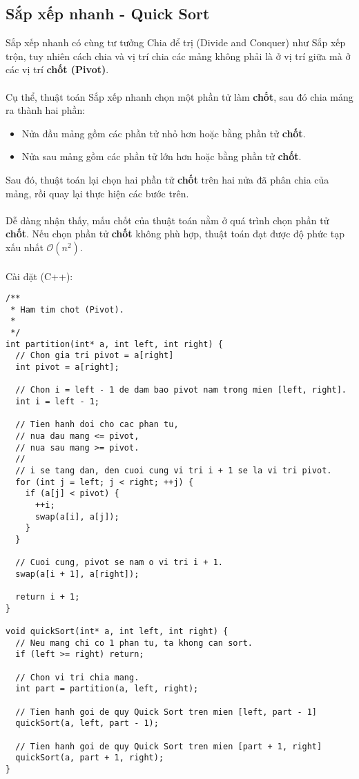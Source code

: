 \documentclass[]{article}
\begin{document}
\subsection{Sắp xếp nhanh - Quick Sort}
Sắp xếp nhanh có cùng tư tưởng Chia để trị (Divide and Conquer) như Sắp xếp trộn, tuy nhiên cách chia và vị trí chia các mảng không phải là ở vị trí giữa mà ở các vị trí \textbf{chốt (Pivot)}.
\\\\
Cụ thể, thuật toán Sắp xếp nhanh chọn một phần tử làm \textbf{chốt}, sau đó chia mảng ra thành hai phần:
\begin{itemize}
\item Nửa đầu mảng gồm các phần tử nhỏ hơn hoặc bằng phần tử \textbf{chốt}.
\item Nửa sau mảng gồm các phần tử lớn hơn hoặc bằng phần tử \textbf{chốt}.
\end{itemize}
Sau đó, thuật toán lại chọn hai phần tử \textbf{chốt} trên hai nửa đã phân chia của mảng, rồi quay lại thực hiện các bước trên.
\\\\
Dễ dàng nhận thấy, mấu chốt của thuật toán nằm ở quá trình chọn phần tử \textbf{chốt}. Nếu chọn phần tử \textbf{chốt} không phù hợp, thuật toán đạt được độ phức tạp xấu nhất $\mathcal{O}(n^2)$.
\\\\
Cài đặt (C++):
\begin{lstlisting}
/**
 * Ham tim chot (Pivot).
 *
 */
int partition(int* a, int left, int right) {
  // Chon gia tri pivot = a[right]
  int pivot = a[right];

  // Chon i = left - 1 de dam bao pivot nam trong mien [left, right].
  int i = left - 1;

  // Tien hanh doi cho cac phan tu,
  // nua dau mang <= pivot,
  // nua sau mang >= pivot.
  //
  // i se tang dan, den cuoi cung vi tri i + 1 se la vi tri pivot.
  for (int j = left; j < right; ++j) {
    if (a[j] < pivot) {
      ++i;
      swap(a[i], a[j]);
    }
  }

  // Cuoi cung, pivot se nam o vi tri i + 1.
  swap(a[i + 1], a[right]);

  return i + 1;
}

void quickSort(int* a, int left, int right) {
  // Neu mang chi co 1 phan tu, ta khong can sort.
  if (left >= right) return;

  // Chon vi tri chia mang.
  int part = partition(a, left, right);

  // Tien hanh goi de quy Quick Sort tren mien [left, part - 1]
  quickSort(a, left, part - 1);

  // Tien hanh goi de quy Quick Sort tren mien [part + 1, right]
  quickSort(a, part + 1, right);
}
\end{lstlisting}
\end{document}
